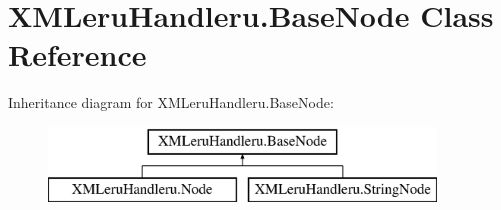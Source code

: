 \hypertarget{class_x_m_leru_handleru_1_1_base_node}{}\section{X\+M\+Leru\+Handleru.\+Base\+Node Class Reference}
\label{class_x_m_leru_handleru_1_1_base_node}
Inheritance diagram for X\+M\+Leru\+Handleru.\+Base\+Node\+:\begin{figure}[H]
\begin{center}
\leavevmode
\includegraphics[height=2.000000cm]{class_x_m_leru_handleru_1_1_base_node}
\end{center}
\end{figure}
